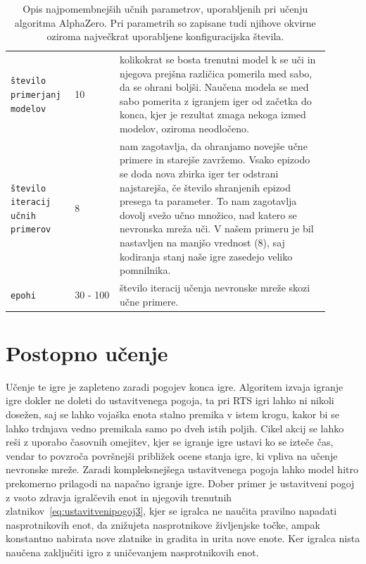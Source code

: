 \documentclass[a4paper, 12pt]{book}
\begin{document}
\begin{table}
	\begin{center}
		\begin{tabular}{p{0.16\linewidth}|p{0.13\linewidth}|p{0.61\linewidth}}

			{\tt število primerjanj modelov}  		  & 10 						& kolikokrat se bosta trenutni model k se uči in njegova prejšna različica pomerila med sabo, da se ohrani boljši.
																				  Naučena modela se med sabo pomerita z igranjem iger od začetka do konca, kjer je rezultat zmaga nekoga izmed modelov, oziroma neodločeno.\\
			{\tt število iteracij učnih primerov}     & 8 						& nam zagotavlja, da ohranjamo novejše učne primere in starejše zavržemo.
																				  Vsako epizodo se doda nova zbirka iger ter odstrani najstarejša, če število shranjenih epizod presega ta parameter.
																				  To nam zagotavlja dovolj svežo učno množico, nad katero se nevronska mreža uči.
																				  V našem primeru je bil nastavljen na manjšo vrednost (8), saj kodiranja stanj naše igre zasedejo veliko pomnilnika.\\
			{\tt epohi}     						  & 30 - 100 				& število iteracij učenja nevronske mreže skozi učne primere.\\
		\end{tabular}
	\end{center}
	\caption{Opis najpomembnejših učnih parametrov, uporabljenih pri učenju algoritma AlphaZero. Pri parametrih so zapisane tudi njihove okvirne oziroma največkrat uporabljene konfiguracijska števila.}
	\label{tableParameters2}
\end{table}

\section{Postopno učenje}
Učenje te igre je zapleteno zaradi pogojev konca igre. 
Algoritem izvaja igranje igre dokler ne doleti do ustavitvenega pogoja, ta pri RTS igri lahko ni nikoli dosežen, saj se lahko vojaška enota stalno premika v istem krogu, kakor bi se lahko trdnjava vedno premikala samo po dveh istih poljih.
Cikel akcij se lahko reši z uporabo časovnih omejitev, kjer se igranje igre ustavi ko se izteče čas, vendar to povzroča površnejši približek ocene stanja igre, ki vpliva na učenje nevronske mreže.
Zaradi kompleksnejšega ustavitvenega pogoja lahko model hitro prekomerno prilagodi na napačno igranje igre.
Dober primer je ustavitveni pogoj z vsoto zdravja igralčevih enot in njegovih trenutnih zlatnikov~\ref{eq:ustavitvenipogoj3}, kjer se igralca ne naučita pravilno napadati nasprotnikovih enot, da znižujeta nasprotnikove življenjske točke, ampak konstantno nabirata nove zlatnike in gradita in urita nove enote.
Ker igralca nista naučena zaključiti igro z uničevanjem nasprotnikovih enot.
\end{document}
